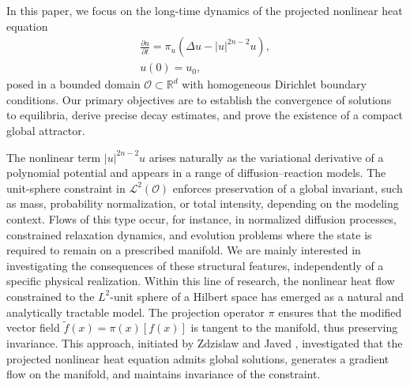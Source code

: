 \documentclass[10pt,a4paper]{amsart}
\numberwithin{equation}{section}
\begin{document}
In this paper, we focus on the long-time dynamics of the projected nonlinear heat
equation
\begin{equation}\label{1.6}
\begin{gathered}
\frac{\partial u}{\partial t} = \pi_{u} \left( \Delta u - |u|^{2n-2} u \right), \\
u(0) = u_{0},
\end{gathered}
\end{equation}
posed in a bounded domain $\mathcal{O}\subset\mathbb{R}^{d}$ with homogeneous Dirichlet
boundary conditions. Our primary objectives are to establish the convergence of
solutions to equilibria, derive precise decay estimates, and prove the existence of
a compact global attractor.

The nonlinear term $|u|^{2n-2}u$ arises naturally as the variational derivative of
a polynomial potential and appears in a range of diffusion–reaction models.
The unit-sphere constraint in $\mathcal L^{2}(\mathcal O)$ enforces preservation of
a global invariant, such as mass, probability normalization, or total intensity,
depending on the modeling context.
Flows of this type occur, for instance, in normalized diffusion processes, constrained
relaxation dynamics, and evolution problems where the state is required to remain on
a prescribed manifold.
We are mainly interested in investigating the consequences of these structural
features, independently of a specific physical realization.
Within this line of research, the nonlinear heat flow constrained to the $L^2$-unit
sphere of a Hilbert space has emerged as a natural and analytically tractable model.
The projection operator $\pi$ ensures that the modified vector field
$\widetilde{f}(x)=\pi(x)[f(x)]$ is tangent to the manifold, thus preserving invariance.
This approach, initiated by Zdzislaw and Javed
\cite{Brz+Huss_2024,Hussain_2005,Huss_2023},
investigated that the projected nonlinear heat equation admits global solutions,
generates a gradient flow on the manifold, and maintains invariance of the constraint.
\end{document}
